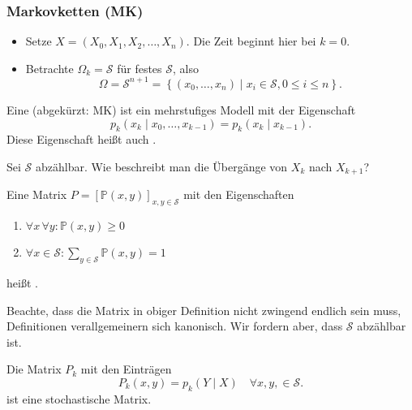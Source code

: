 \subsubsection{Markovketten (MK)}
\begin{itemize}
    \item Setze $X = (X_0,X_1,X_2,\ldots,X_n)$. Die Zeit beginnt hier bei $k=0$.
    \item Betrachte  $\Omega_k = \mathcal{S}$ für festes $\mathcal{S}$, also
        \[
            \Omega = \mathcal{S}^{n+1} = \left \{(x_0,\ldots,x_n) \mid  x_i \in \mathcal{S}, 0\leq i\leq n\right\} 
        .\] 
\end{itemize}
\begin{definition}[Markovkette]\label{def:markovkette}
    Eine  (abgekürzt: MK) ist ein mehrstufiges Modell mit der Eigenschaft
    \[
        p_k(x_k \mid  x_0,\ldots,x_{k-1}) = p_k (x_k\mid x_{k-1})
    .\] 
    Diese Eigenschaft heißt auch . 
\end{definition}
\begin{question}
    Sei $\mathcal{S}$ abzählbar. Wie beschreibt man die Übergänge von $X_k$ nach  $X_{k+1}$?
\end{question}
\begin{definition}\label{def:stochastische-matrix}
    Eine Matrix $P = [\mathbb{P}(x,y)]_{x,y\in \mathcal{S}}$ mit den Eigenschaften
    \begin{enumerate}[label=\protect\circled{\alph*}]
        \item $\forall x\, \forall y \colon\mathbb{P}(x,y) \geq  0$
        \item $\forall x\in \mathcal{S}\colon\sum_{y\in \mathcal{S}} \mathbb{P}(x,y) = 1$
    \end{enumerate}
    heißt . 
\end{definition}
\begin{remark*}
    Beachte, dass die Matrix in obiger Definition nicht zwingend endlich sein muss, Definitionen verallgemeinern sich kanonisch. Wir fordern aber, dass $\mathcal{S}$ abzählbar ist.
\end{remark*}
\begin{lemma}
    Die Matrix $P_k$ mit den Einträgen
    \[
        P_k(x,y) = p_k(Y \mid X) \quad \forall x,y,\in \mathcal{S}
    .\] 
    ist eine stochastische Matrix.
\end{lemma}
